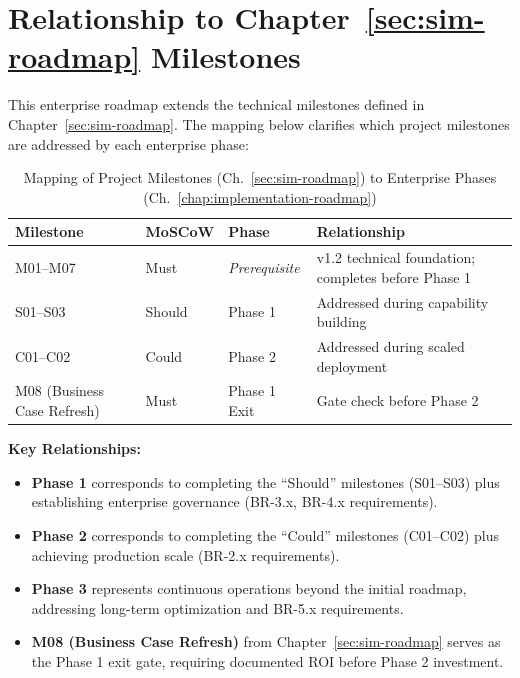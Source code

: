 \section*{Relationship to Chapter~\ref{sec:sim-roadmap} Milestones}

This enterprise roadmap extends the technical milestones defined in 
Chapter~\ref{sec:sim-roadmap}. The mapping below clarifies which project
milestones are addressed by each enterprise phase:

\begin{table}[htbp]
\centering
\caption{Mapping of Project Milestones (Ch.~\ref{sec:sim-roadmap}) to Enterprise Phases (Ch.~\ref{chap:implementation-roadmap})}
\label{tab:milestone-to-phase}
\footnotesize
\begin{tabularx}{\textwidth}{@{}l l l X@{}}
\toprule
\textbf{Milestone} & \textbf{MoSCoW} & \textbf{Phase} & \textbf{Relationship} \\
\midrule
M01--M07 & Must & \textit{Prerequisite} & v1.2 technical foundation; completes before Phase 1 \\
S01--S03 & Should & Phase 1 & Addressed during capability building \\
C01--C02 & Could & Phase 2 & Addressed during scaled deployment \\
M08 (Business Case Refresh) & Must & Phase 1 Exit & Gate check before Phase 2 \\
\bottomrule
\end{tabularx}
\end{table}

\noindent
\textbf{Key Relationships:}
\begin{itemize}
  \item \textbf{Phase 1} corresponds to completing the ``Should'' milestones (S01--S03)
        plus establishing enterprise governance (BR-3.x, BR-4.x requirements).
  \item \textbf{Phase 2} corresponds to completing the ``Could'' milestones (C01--C02)
        plus achieving production scale (BR-2.x requirements).
  \item \textbf{Phase 3} represents continuous operations beyond the initial roadmap,
        addressing long-term optimization and BR-5.x requirements.
  \item \textbf{M08 (Business Case Refresh)} from Chapter~\ref{sec:sim-roadmap} serves
        as the Phase 1 exit gate, requiring documented ROI before Phase 2 investment.
\end{itemize}

